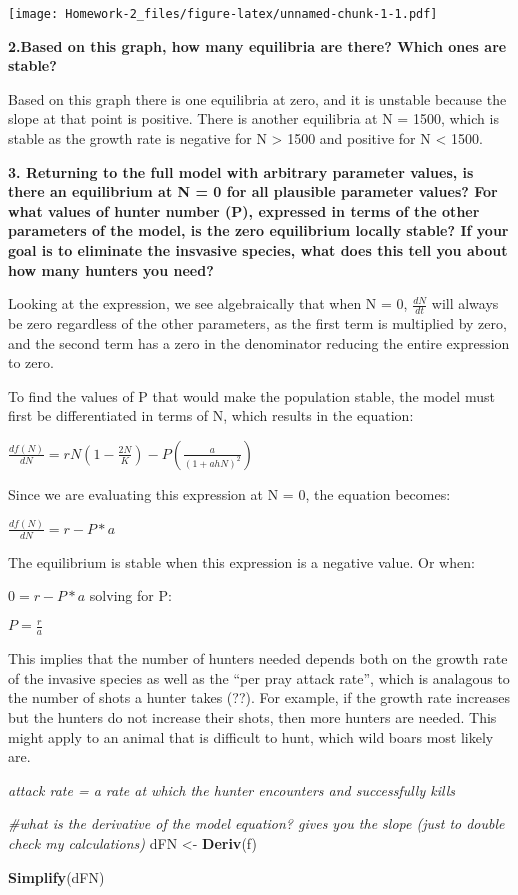 \documentclass[]{article}
\newenvironment{Shaded}{\begin{snugshade}}{\end{snugshade}}
\newcommand{\KeywordTok}[1]{\textcolor[rgb]{0.13,0.29,0.53}{\textbf{#1}}}
\newcommand{\StringTok}[1]{\textcolor[rgb]{0.31,0.60,0.02}{#1}}
\newcommand{\CommentTok}[1]{\textcolor[rgb]{0.56,0.35,0.01}{\textit{#1}}}
\newcommand{\NormalTok}[1]{#1}
\begin{document}
\texttt{[image: Homework-2\_files/figure-latex/unnamed-chunk-1-1.pdf]}

\textbf{2.Based on this graph, how many equilibria are there? Which ones
are stable?}

Based on this graph there is one equilibria at zero, and it is unstable
because the slope at that point is positive. There is another equilibria
at N = 1500, which is stable as the growth rate is negative for N
\textgreater{} 1500 and positive for N \textless{} 1500.

\textbf{3. Returning to the full model with arbitrary parameter values,
is there an equilibrium at N = 0 for all plausible parameter values? For
what values of hunter number (P), expressed in terms of the other
parameters of the model, is the zero equilibrium locally stable? If your
goal is to eliminate the insvasive species, what does this tell you
about how many hunters you need?}

Looking at the expression, we see algebraically that when N = 0,
\(\frac{dN}{dt}\) will always be zero regardless of the other
parameters, as the first term is multiplied by zero, and the second term
has a zero in the denominator reducing the entire expression to zero.

To find the values of P that would make the population stable, the model
must first be differentiated in terms of N, which results in the
equation:

\(\frac{df(N)}{dN} = rN(1-\frac{2N}{K}) - P(\frac{a}{(1 + ahN)^2})\)

Since we are evaluating this expression at N = 0, the equation becomes:

\(\frac{df(N)}{dN} = r-P*a\)

The equilibrium is stable when this expression is a negative value. Or
when:

\(0 = r-P*a\) solving for P:

\(P = \frac{r}{a}\)

This implies that the number of hunters needed depends both on the
growth rate of the invasive species as well as the ``per pray attack
rate'', which is analagous to the number of shots a hunter takes (??).
For example, if the growth rate increases but the hunters do not
increase their shots, then more hunters are needed. This might apply to
an animal that is difficult to hunt, which wild boars most likely are.

\emph{attack rate = a rate at which the hunter encounters and
successfully kills}

\begin{Shaded}
\begin{Highlighting}[]
\CommentTok{#what is the derivative of the model equation? gives you the slope (just to double check my calculations)}
\NormalTok{dFN <-}\StringTok{ }\KeywordTok{Deriv}\NormalTok{(f)}

\KeywordTok{Simplify}\NormalTok{(dFN)}
\end{Highlighting}
\end{Shaded}
\end{document}
